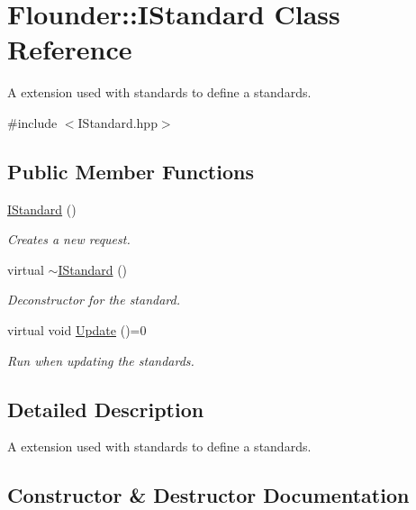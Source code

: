 \hypertarget{class_flounder_1_1_i_standard}{}\section{Flounder\+:\+:I\+Standard Class Reference}
\label{class_flounder_1_1_i_standard}


A extension used with standards to define a standards.  




{\ttfamily \#include $<$I\+Standard.\+hpp$>$}

\subsection*{Public Member Functions}
\begin{DoxyCompactItemize}
\item 
\hyperlink{class_flounder_1_1_i_standard_ad17f71c0fd5e775722ba2a56ab21aaac}{I\+Standard} ()
\begin{DoxyCompactList}\small\item\em Creates a new request. \end{DoxyCompactList}\item 
virtual \hyperlink{class_flounder_1_1_i_standard_ad43f304ece0273eb0f3ddcea1f4e8472}{$\sim$\+I\+Standard} ()
\begin{DoxyCompactList}\small\item\em Deconstructor for the standard. \end{DoxyCompactList}\item 
virtual void \hyperlink{class_flounder_1_1_i_standard_aaf59f5b41de0afc23bd031067e367b5a}{Update} ()=0
\begin{DoxyCompactList}\small\item\em Run when updating the standards. \end{DoxyCompactList}\end{DoxyCompactItemize}


\subsection{Detailed Description}
A extension used with standards to define a standards. 



\subsection{Constructor \& Destructor Documentation}
\mbox{\label{class_flounder_1_1_i_standard_ad17f71c0fd5e775722ba2a56ab21aaac}} 
